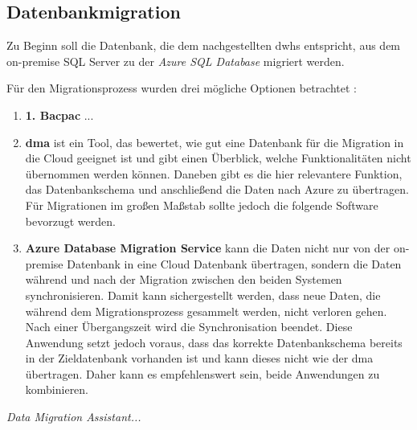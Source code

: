 \subsection{Datenbankmigration} \label{subsec:praktischeUmsetzung:Datenmigration}
Zu Beginn soll die Datenbank, die dem nachgestellten \acp{dwh} entspricht, aus dem on-premise SQL Server zu der \textit{Azure SQL Database} migriert werden. 

Für den Migrationsprozess wurden drei mögliche Optionen betrachtet \cite{soh_microsoft_2020}: 
\begin{enumerate}
\item \textbf{1. Bacpac} ...
\item \textbf{\ac{dma}} ist ein Tool, das bewertet, wie gut eine Datenbank für die Migration in die Cloud geeignet ist und gibt einen Überblick, welche Funktionalitäten nicht übernommen werden können. Daneben gibt es die hier relevantere Funktion, das Datenbankschema und anschließend die Daten nach Azure zu übertragen. Für Migrationen im großen Maßstab sollte jedoch die folgende Software bevorzugt werden. 
\item \textbf{Azure Database Migration Service} kann die Daten nicht nur von der on-premise Datenbank in eine Cloud Datenbank übertragen, sondern die Daten während und nach der Migration zwischen den beiden Systemen synchronisieren. Damit kann sichergestellt werden, dass neue Daten, die während dem Migrationsprozess gesammelt werden, nicht verloren gehen. Nach einer Übergangszeit wird die Synchronisation beendet. Diese Anwendung setzt jedoch voraus, dass das korrekte Datenbankschema bereits in der Zieldatenbank vorhanden ist und kann dieses nicht wie der \ac{dma} übertragen. Daher kann es empfehlenswert sein, beide Anwendungen zu kombinieren.
\end{enumerate}

\textit{Data Migration Assistant...}

